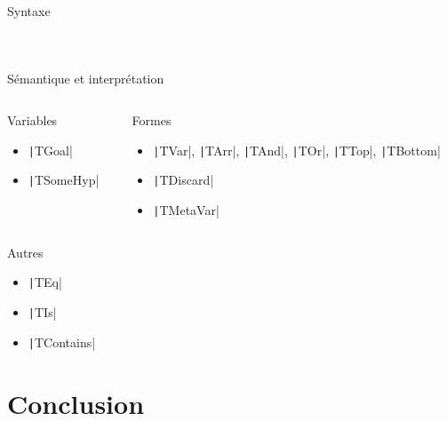 \documentclass[french,usepdftitle=false,compress]{beamer}
\begin{document}
\begin{frame}{Syntaxe}
  \inputminted[fontsize=\small]{ocaml}{syntax_var.ml}
  \vfill
  \inputminted[fontsize=\small]{ocaml}{syntax_form.ml}
  \vfill
  \inputminted[fontsize=\small]{ocaml}{syntax.ml}
\end{frame}

\begin{frame}{Sémantique et interprétation}
  \begin{columns}
    \begin{column}{0.5\textwidth}
      \begin{block}{Variables}
        \begin{itemize}
          \item \texttt|TGoal|
          \item \texttt|TSomeHyp|
        \end{itemize}
      \end{block}
    \end{column}

    \begin{column}{0.5\textwidth}
      \begin{block}{Formes}
        \begin{itemize}
          \item \texttt|TVar|, \texttt|TArr|, \texttt|TAnd|, \texttt|TOr|, \texttt|TTop|, \texttt|TBottom|
          \item \texttt|TDiscard|
          \item \texttt|TMetaVar|
        \end{itemize}
      \end{block}
    \end{column}
  \end{columns}

  \begin{block}{Autres}
    \begin{itemize}
      \item \texttt|TEq|
      \item \texttt|TIs|
      \item \texttt|TContains|
    \end{itemize}
  \end{block}
\end{frame}

\section{Conclusion}
\end{document}
